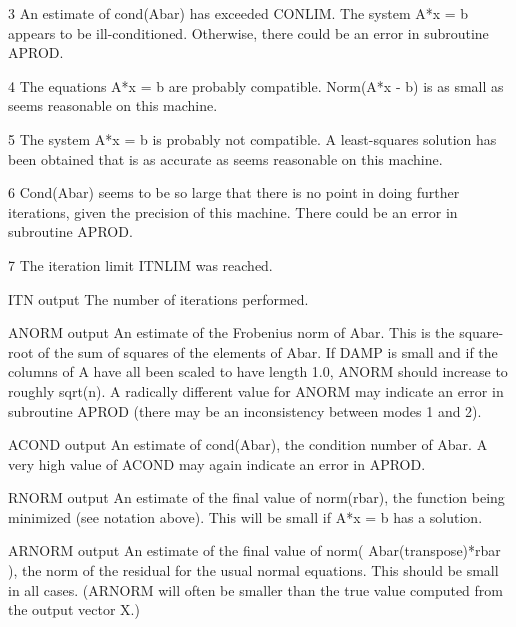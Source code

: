 \documentclass[11pt,twoside,nolof]{starlink}
\begin{document}
\begin{terminalv}
                3       An estimate of cond(Abar) has exceeded
                        CONLIM.  The system A*x = b appears to be
                        ill-conditioned.  Otherwise, there could be an
                        error in subroutine APROD.

                4       The equations A*x = b are probably
                        compatible.  Norm(A*x - b) is as small as
                        seems reasonable on this machine.

                5       The system A*x = b is probably not
                        compatible.  A least-squares solution has
                        been obtained that is as accurate as seems
                        reasonable on this machine.

                6       Cond(Abar) seems to be so large that there is
                        no point in doing further iterations,
                        given the precision of this machine.
                        There could be an error in subroutine APROD.

                7       The iteration limit ITNLIM was reached.

     ITN     output     The number of iterations performed.

     ANORM   output     An estimate of the Frobenius norm of  Abar.
                        This is the square-root of the sum of squares
                        of the elements of Abar.
                        If DAMP is small and if the columns of A
                        have all been scaled to have length 1.0,
                        ANORM should increase to roughly sqrt(n).
                        A radically different value for ANORM may
                        indicate an error in subroutine APROD (there
                        may be an inconsistency between modes 1 and 2).

     ACOND   output     An estimate of cond(Abar), the condition
                        number of Abar.  A very high value of ACOND
                        may again indicate an error in APROD.

     RNORM   output     An estimate of the final value of norm(rbar),
                        the function being minimized (see notation
                        above).  This will be small if A*x = b has
                        a solution.

     ARNORM  output     An estimate of the final value of
                        norm( Abar(transpose)*rbar ), the norm of
                        the residual for the usual normal equations.
                        This should be small in all cases.  (ARNORM
                        will often be smaller than the true value
                        computed from the output vector X.)


\end{terminalv}
\end{document}
